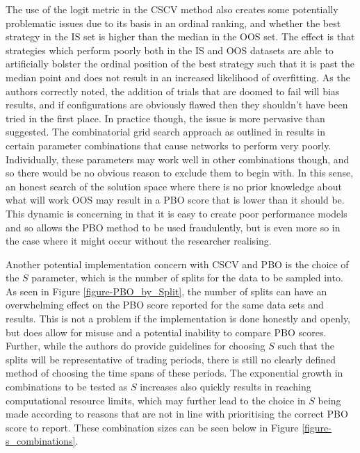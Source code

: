 \documentclass[a4paper,11pt,oneside]{article}
\theoremstyle{plain}
\theoremstyle{definition}
\begin{document}
\texttt{}\newline
The use of the logit metric in the CSCV method also creates some potentially problematic issues due to its basis in an ordinal ranking, and whether the best strategy in the IS set is higher than the median in the OOS set. The effect is that strategies which perform poorly both in the IS and OOS datasets are able to artificially bolster the ordinal position of the best strategy such that it is past the median point and does not result in an increased likelihood of overfitting. As the authors correctly noted, the addition of trials that are doomed to fail will bias results, and if configurations are obviously flawed then they shouldn't have been tried in the first place. In practice though, the issue is more pervasive than suggested. The combinatorial grid search approach as outlined in  results in certain parameter combinations that cause networks to perform very poorly. Individually, these parameters may work well in other combinations though, and so there would be no obvious reason to exclude them to begin with. In this sense, an honest search of the solution space where there is no prior knowledge about what will work OOS may result in a PBO score that is lower than it should be. This dynamic is concerning in that it is easy to create poor performance models and so allows the PBO method to be used fraudulently, but is even more so in the case where it might occur without the researcher realising. 

\texttt{}\newline
Another potential implementation concern with CSCV and PBO is the choice of the $S$ parameter, which is the number of splits for the data to be sampled into. As seen in Figure \ref{figure-PBO_by_Split}, the number of splits can have an overwhelming effect on the PBO score reported for the same data sets and results. This is not a problem if the implementation is done honestly and openly, but does allow for misuse and a potential inability to compare PBO scores. Further, while the authors do provide guidelines for choosing $S$ such that the splits will be representative of trading periods, there is still no clearly defined method of choosing the time spans of these periods. The exponential growth in combinations to be tested as $S$ increases also quickly results in reaching computational resource limits, which may further lead to the choice in $S$ being made according to reasons that are not in line with prioritising the correct PBO score to report. These combination sizes can be seen below in Figure \ref{figure-s_combinations}.
\end{document}
